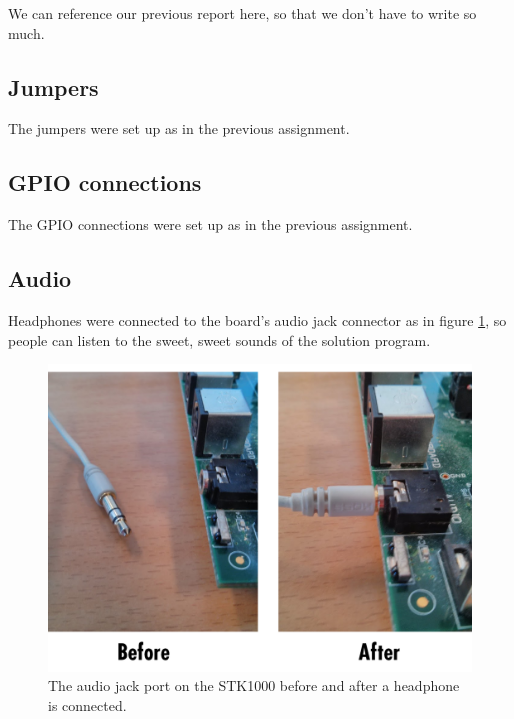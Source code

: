 We can reference our previous report here, so that we don't have to write so much.

\subsection{Jumpers}

The jumpers were set up as in the previous assignment.\cite{tdt4258-1}

\subsection{GPIO connections}

The GPIO connections were set up as in the previous assignment.\cite{tdt4258-1}

\subsection{Audio}

Headphones were connected to the board's audio jack connector as in figure \ref{img-audiojack}, so people can listen to the sweet, sweet sounds of the solution program.

\begin{figure}[H]
	\includegraphics[width = \textwidth]{images/audiojack.png}
	\caption{The audio jack port on the STK1000 before and after a headphone is connected.}
	\label{img-audiojack}
\end{figure}